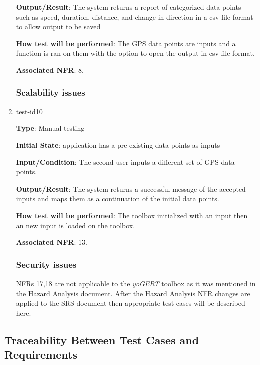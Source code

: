 \documentclass[12pt, titlepage]{article}
\begin{document}
\begin{enumerate}
\textbf{Output/Result}: The system returns a report of categorized data points such
as speed, duration, distance, and change in direction in a csv file format to allow output to be saved
					
\textbf{How test will be performed}: The GPS data points are inputs and a function is ran on them with the option to open the output in csv file format.

\textbf{Associated NFR}: 8.

\subsubsection{Scalability issues}

\item{test-id10\\}

\textbf{Type}: Manual testing
					
\textbf{Initial State}: application has a pre-existing data points as inputs
					
\textbf{Input/Condition}: The second user inputs a different set of GPS data points.
					
\textbf{Output/Result}: The system returns a successful message of the accepted inputs and maps them as a continuation of the initial data points. 
					
\textbf{How test will be performed}: The toolbox initialized with an input then an new input is loaded on the toolbox. 

\textbf{Associated NFR}: 13.

\subsubsection{Security issues}
NFRs 17,18  are not applicable to the \emph{yoGERT} toolbox as it was mentioned in the Hazard Analysis document. After the Hazard Analysis NFR changes are applied to the SRS document then appropriate test cases will be described here.

\end{enumerate}
\subsection{Traceability Between Test Cases and Requirements}
\end{document}
